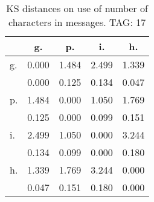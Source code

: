 \begin{table}[h!]
\begin{center}
\begin{tabular}{| l | c | c | c | c |}\hline
 & g. & p. & i. & h. \\\hline
g. & 0.000  & 1.484  & 2.499  & 1.339 \\\hline
 & 0.000  & 0.125  & 0.134  & 0.047 \\\hline
p. & 1.484  & 0.000  & 1.050  & 1.769 \\\hline
 & 0.125  & 0.000  & 0.099  & 0.151 \\\hline
i. & 2.499  & 1.050  & 0.000  & 3.244 \\\hline
 & 0.134  & 0.099  & 0.000  & 0.180 \\\hline
h. & 1.339  & 1.769  & 3.244  & 0.000 \\\hline
 & 0.047  & 0.151  & 0.180  & 0.000 \\\hline
\end{tabular}
\caption{KS distances on use of number of characters in messages. TAG: 17}
\end{center}
\end{table}